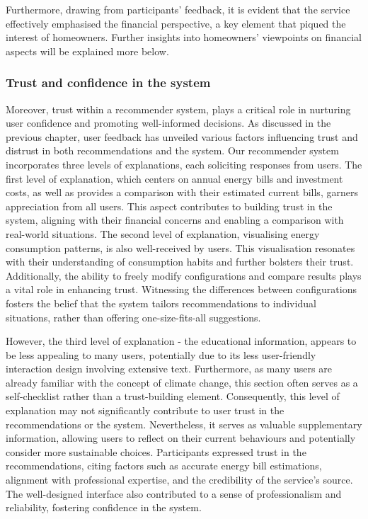 Furthermore, drawing from participants' feedback, it is evident that the service effectively emphasised the financial perspective, a key element that piqued the interest of homeowners. 
Further insights into homeowners' viewpoints on financial aspects will be explained more below.


\subsubsection*{Trust and confidence in the system}

Moreover, trust within a recommender system, plays a critical role in nurturing user confidence and promoting well-informed decisions.
As discussed in the previous chapter, user feedback has unveiled various factors influencing trust and distrust in both recommendations and the system. 
Our recommender system incorporates three levels of explanations, each soliciting responses from users.
The first level of explanation, which centers on annual energy bills and investment costs, as well as provides a comparison with their estimated current bills, garners appreciation from all users. 
This aspect contributes to building trust in the system, aligning with their financial concerns and enabling a comparison with real-world situations. 
The second level of explanation, visualising energy consumption patterns, is also well-received by users. 
This visualisation resonates with their understanding of consumption habits and further bolsters their trust. 
Additionally, the ability to freely modify configurations and compare results plays a vital role in enhancing trust. 
Witnessing the differences between configurations fosters the belief that the system tailors recommendations to individual situations, rather than offering one-size-fits-all suggestions. 

However, the third level of explanation - the educational information, appears to be less appealing to many users, potentially due to its less user-friendly interaction design involving extensive text. 
Furthermore, as many users are already familiar with the concept of climate change, this section often serves as a self-checklist rather than a trust-building element. 
Consequently, this level of explanation may not significantly contribute to user trust in the recommendations or the system. 
Nevertheless, it serves as valuable supplementary information, allowing users to reflect on their current behaviours and potentially consider more sustainable choices.
Participants expressed trust in the recommendations, citing factors such as accurate energy bill estimations, alignment with professional expertise, and the credibility of the service's source. 
The well-designed interface also contributed to a sense of professionalism and reliability, fostering confidence in the system.


